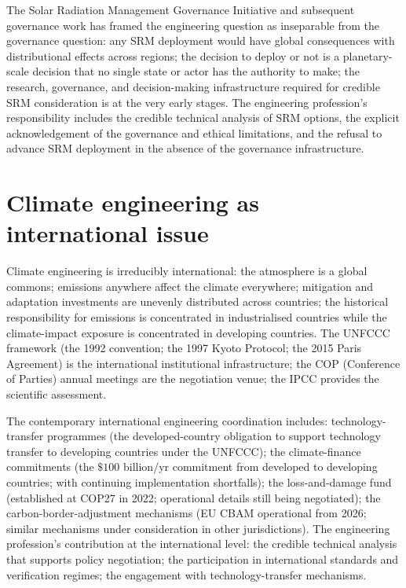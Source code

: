The Solar Radiation Management Governance Initiative \cite{paper:srmgi-2011} and subsequent governance work has framed the engineering question as inseparable from the governance question: any SRM deployment would have global consequences with distributional effects across regions; the decision to deploy or not is a planetary-scale decision that no single state or actor has the authority to make; the research, governance, and decision-making infrastructure required for credible SRM consideration is at the very early stages. The engineering profession's responsibility includes the credible technical analysis of SRM options, the explicit acknowledgement of the governance and ethical limitations, and the refusal to advance SRM deployment in the absence of the governance infrastructure.

\section{Climate engineering as international issue}

Climate engineering is irreducibly international: the atmosphere is a global commons; emissions anywhere affect the climate everywhere; mitigation and adaptation investments are unevenly distributed across countries; the historical responsibility for emissions is concentrated in industrialised countries while the climate-impact exposure is concentrated in developing countries. The UNFCCC framework (the 1992 convention; the 1997 Kyoto Protocol; the 2015 Paris Agreement) is the international institutional infrastructure; the COP (Conference of Parties) annual meetings are the negotiation venue; the IPCC provides the scientific assessment.

The contemporary international engineering coordination includes: technology-transfer programmes (the developed-country obligation to support technology transfer to developing countries under the UNFCCC); the climate-finance commitments (the $\$100$ billion/yr commitment from developed to developing countries; with continuing implementation shortfalls); the loss-and-damage fund (established at COP27 in 2022; operational details still being negotiated); the carbon-border-adjustment mechanisms (EU CBAM operational from 2026; similar mechanisms under consideration in other jurisdictions). The engineering profession's contribution at the international level: the credible technical analysis that supports policy negotiation; the participation in international standards and verification regimes; the engagement with technology-transfer mechanisms.

